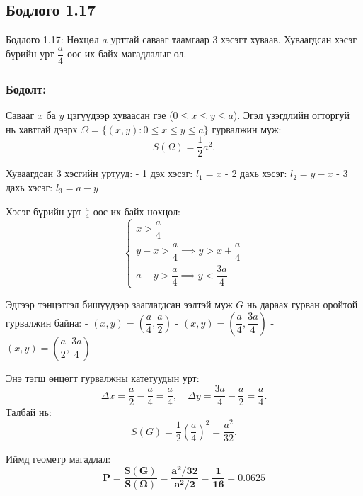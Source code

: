 \documentclass[11pt,a4paper]{article}
\begin{document}
\subsection*{Бодлого 1.17}

\begin{problembox}{Бодлого 1.17: Нөхцөл}
$a$ урттай савааг таамгаар 3 хэсэгт хуваав. Хуваагдсан хэсэг бүрийн урт $\dfrac{a}{4}$-өөс их байх магадлалыг ол.
\end{problembox}

\subsubsection*{Бодолт:}

Савааг $x$ ба $y$ цэгүүдээр хуваасан гэе ($0 \le x \le y \le a$).
Эгэл үзэгдлийн огторгуй нь хавтгай дээрх $\Omega = \{(x, y) : 0 \le x \le y \le a\}$ гурвалжин муж:
\[
  S(\Omega) = \frac{1}{2} a^2.
\]

Хуваагдсан 3 хэсгийн уртууд:
- 1 дэх хэсэг: $l_1 = x$
- 2 дахь хэсэг: $l_2 = y - x$
- 3 дахь хэсэг: $l_3 = a - y$

Хэсэг бүрийн урт $\frac{a}{4}$-өөс их байх нөхцөл:
\[
  \begin{cases} x > \dfrac{a}{4} \\[6pt] y - x > \dfrac{a}{4} \implies y > x + \dfrac{a}{4} \\[6pt] a - y > \dfrac{a}{4} \implies y < \dfrac{3a}{4} \end{cases}
\]

Эдгээр тэнцэтгэл бишүүдээр зааглагдсан ээлтэй муж $G$ нь дараах гурван оройтой гурвалжин байна:
- $(x, y) = \left(\dfrac{a}{4}, \dfrac{a}{2}\right)$
- $(x, y) = \left(\dfrac{a}{4}, \dfrac{3a}{4}\right)$
- $(x, y) = \left(\dfrac{a}{2}, \dfrac{3a}{4}\right)$

Энэ тэгш өнцөгт гурвалжны катетуудын урт:
\[
  \Delta x = \frac{a}{2} - \frac{a}{4} = \frac{a}{4}, \quad \Delta y = \frac{3a}{4} - \frac{a}{2} = \frac{a}{4}.
\]
Талбай нь:
\[
  S(G) = \frac{1}{2} \left(\frac{a}{4}\right)^2 = \frac{a^2}{32}.
\]

Иймд геометр магадлал:
\[
  \mathbf{P = \frac{S(G)}{S(\Omega)} = \frac{a^2 / 32}{a^2 / 2} = \frac{1}{16} = 0.0625}
\]

\vspace{0.8em}
\end{document}
